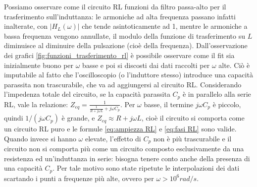 \documentclass[a4paper]{article}
\begin{document}
Possiamo osservare come il circuito RL funzioni da filtro passa-alto per il trasferimento sull'induttanza: le armoniche ad alta frequenza passano infatti inalterate, con $|H_L(\omega)|$ che tende asintoticamente ad 1, mentre le armoniche a bassa frequenza vengono annullate, il modulo della funzione di trasferimento su $L$ diminuisce al diminuire della pulsazione (cioè della frequenza). Dall'osservazione dei grafici \ref{fig:funzioni_trasferimento_rl} è possibile osservare come il fit sia inizialmente buono per $\omega$ basse e poi si discosti dai dati raccolti per $\omega$ alte. Ciò è imputabile al fatto che l'oscilloscopio (o l'induttore stesso) introduce una capacità parassita non trascurabile, che va ad aggiungersi al circuito RL. Considerando l'impedenza totale del circuito, se la capacità parassita $C_p$ è in parallelo alla serie RL, vale la relazione: $Z_{eq} = \frac{1}{\frac{1}{R+j\omega L}+j\omega C_p}$. Per $\omega$ basse, il termine $j\omega C_p$ è piccolo, quindi $1/(j\omega C_p)$ è grande, e $Z_{eq} \approx R+j\omega L$, cioè il circuito si comporta come un circuito RL puro e le formule \ref{eq:ampiezza RL} e \ref{eq:fasi RL} sono valide. Quando invece si hanno $\omega$ elevate, l'effetto di $C_p$ non è più trascurabile e il circuito non si comporta più come un circuito composto esclusivamente da una resistenza ed un'induttanza in serie: bisogna tenere conto anche della presenza di una capacità $C_p$. Per tale motivo sono state ripetute le interpolazioni dei dati scartando i punti a frequenze più alte, ovvero per $\omega>10^6 rad/s$.
\end{document}
